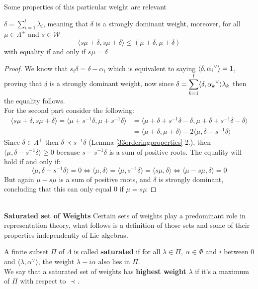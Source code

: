 Some properties of this particular weight are relevant 
\begin{lema}
	$\delta = \displaystyle \sum_{i=1}^l \lambda_i$, meaning that $\delta$ is a strongly dominant weight, moreover, for all $\mu \in \Lambda^+$ and $s \in \mathcal{W}$  $$\langle s\mu + \delta, s\mu+ \delta\rangle \le (\mu + \delta, \mu + \delta)$$ with equality if and only if $s\mu = \delta$ 	
\end{lema}
\begin{proof}
	We know that $s_i\delta=\delta-\alpha_i$ which is equivalent to saying $\langle {\delta},{\alpha_i}^\lor\rangle=1$, proving that $\delta$ is a strongly dominant weight, now since $\delta = \displaystyle\sum_{k=1}^l \langle {\delta},{\alpha_k}^\lor\rangle\lambda_k$ then the equality follows.\\
	For the second part consider the following:
	\begin{align*}
	\langle s\mu + \delta, s\mu + \delta \rangle  = \langle \mu + s^{-1}\delta, \mu + s^{-1}\delta \rangle &= \langle \mu+ \delta + s^{-1}\delta - \delta , \mu + \delta + s^{-1}\delta - \delta \rangle \\
	&=\langle \mu + \delta, \mu + \delta\rangle - 2\langle \mu,\delta-s^{-1}\delta\rangle
	\end{align*}
	Since $\delta \in \Lambda^+$ then $\delta \prec s^{-1}\delta$ (Lemma \ref{33orderingproperties} 2.), then $\langle \mu, \delta - s^{-1}\delta\rangle \ge 0$ because $s-s^{-1}\delta$ is a sum of positive roots. The equality will hold if and only if:
	$$\langle\mu,\delta-s^{-1}\delta\rangle = 0 \iff \langle \mu,\delta\rangle = \langle \mu, s^{-1}\delta\rangle = \langle s \mu, \delta \rangle \iff \langle \mu - s\mu,\delta \rangle = 0$$
	But again $\mu-s\mu$ is a sum of positive roots, and $\delta$ is strongly dominant, concluding that this can only equal $0$ if $\mu=s\mu$
\end{proof}\\
\textbf{Saturated set of Weights}
Certain sets of weights play a predominant role in representation theory, what follows is a definition of those sets and some of their properties independently of Lie algebras.
\begin{defi}
	A finite subset $\Pi$ of $\Lambda$ is called \textbf{saturated} if for all $\lambda \in \Pi,\ \alpha \in \Phi$ and $i$ between $0$ and $\langle \lambda, \alpha^\lor\rangle $, the weight $\lambda - i\alpha$ also lies in $\Pi$.\\
	We say that a saturated set of weights has \textbf{highest weight} $\lambda$ if it's a maximum of $\Pi$ with respect to $\prec$.\\
\end{defi}

